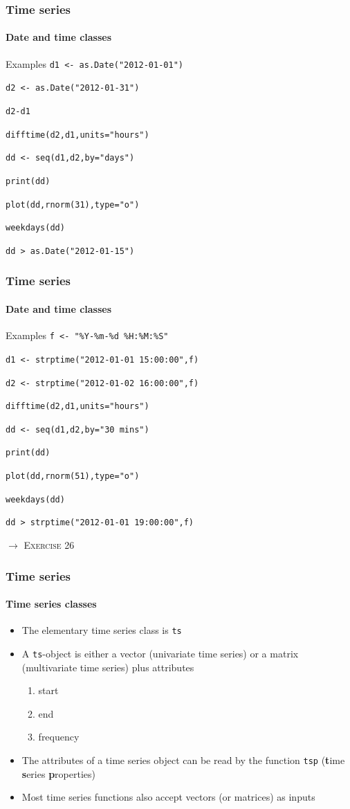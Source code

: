 \documentclass[title={Introduction to R}, author={Mutschler and Zaharieva}, inst={Institute for Econometrics and Empirical Economics}]{beamer}
\begin{document}
\begin{frame}
	\frametitle{Time series}	
	\framesubtitle{Date and time classes}	
	\begin{block}{Examples}
		\texttt{d1 <- as.Date("2012-01-01")}
				
		\texttt{d2 <- as.Date("2012-01-31")}
		
		\texttt{d2-d1}
		
		\texttt{difftime(d2,d1,units="hours")}
		
		\texttt{dd <- seq(d1,d2,by="days")}
		
		\texttt{print(dd)}
		
		\texttt{plot(dd,rnorm(31),type="o")}
		
		\texttt{weekdays(dd)}
		
		\texttt{dd > as.Date("2012-01-15")}
	\end{block}
\end{frame}


\begin{frame}
	\frametitle{Time series}	
	\framesubtitle{Date and time classes}	
	\begin{block}{Examples}
		\texttt{f <- "\%Y-\%m-\%d \%H:\%M:\%S"}
		
		\texttt{d1 <- strptime("2012-01-01 15:00:00",f)}
		
		\texttt{d2 <- strptime("2012-01-02 16:00:00",f)}
		
		\texttt{difftime(d2,d1,units="hours")}
		
		\texttt{dd <- seq(d1,d2,by="30 mins")}
		
		\texttt{print(dd)}
		
		\texttt{plot(dd,rnorm(51),type="o")}
		
		\texttt{weekdays(dd)}
		
		\texttt{dd > strptime("2012-01-01 19:00:00",f)}
	\end{block}\pause
	$\longrightarrow $ \textsc{Exercise 26}
\end{frame}


\begin{frame}
	\frametitle{Time series}	
	\framesubtitle{Time series classes}	
	\begin{itemize}
		\item The elementary time series class is \texttt{ts}		
		\item A \texttt{ts}-object is either a vector (univariate time series) or a
		matrix (multivariate time series) plus attributes		
		\begin{enumerate}
			\item start			
			\item end			
			\item frequency
		\end{enumerate}		
		\item The attributes of a time series object can be read by the function 
		\texttt{tsp} (\textbf{t}ime \textbf{s}eries \textbf{p}roperties)		
		\item Most time series functions also accept vectors (or matrices) as inputs
	\end{itemize}
\end{frame}
\end{document}
